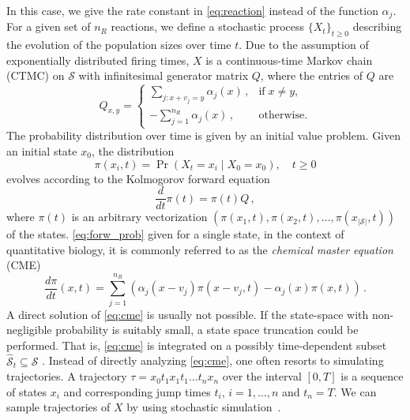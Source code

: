 In this case, we give the rate constant in \eqref{eq:reaction} instead of the function $\alpha_j$.
For a given set of $n_R$ reactions, we define a stochastic
process $\{{{X}}_t\}_{t\geq 0}$ describing the evolution of the population
sizes over time $t$.
Due to the assumption of exponentially distributed firing times,  $ X$ is
a continuous-time
Markov chain (CTMC) on $\mathcal{S}$ with infinitesimal  generator matrix $Q$, where
the entries of $Q$ are
\begin{equation}\label{eq:cme_generator}
    Q_{ x,  y} = \begin{cases}
        \sum_{j: x+ v_j = y}\alpha_j( x)\,,&\text{if}\; x\neq
         y,\\[1ex]
        -\sum_{j=1}^{n_R} \alpha_j( x)\,, &\text{otherwise.}
    \end{cases}
\end{equation}
The probability distribution over time is given by an
initial value problem.
Given an initial state $x_0$, the distribution
\begin{equation}\label{eq:forw_prob}
\pi(x_i, t)=\Pr(X_t=x_i\mid X_0=x_0),\quad t\geq 0
\end{equation}
evolves according to the Kolmogorov forward equation
\begin{equation}\label{eq:forward}
\frac{d}{dt}\pi(t) = \pi(t) Q\,,
\end{equation}
where $\pi(t)$ is an arbitrary vectorization $(\pi(x_1,t), \pi(x_2,t),\dots,\pi(x_{|\mathcal{S}|},t))$ of the states.
\eqref{eq:forw_prob} given for a single state, in the context of quantitative biology, it is commonly referred to
as the \emph{chemical master equation} (CME)
\begin{equation}\label{eq:cme}
    \frac{d\pi}{d t} ( x,t) =
    \sum_{j=1}^{n_R}\left(
        \alpha_j( x- v_j)\pi( x- v_j,t) - \alpha_j( x)\pi( x,t)
    \right)\,.
\end{equation}
A direct solution of \eqref{eq:cme} is usually not possible.
If the state-space with non-negligible probability is suitably small, a state space
truncation could be performed. That is, \eqref{eq:cme} is integrated on a possibly time-dependent subset
$\hat{\mathcal{S}}_t\subseteq\mathcal{S}$ \cite{henzinger2009sliding,munsky2006finite,spieler2014numerical}.
Instead of directly analyzing \eqref{eq:cme}, one often resorts to simulating trajectories.
A trajectory $\tau=x_0t_1x_1t_1\dots t_n x_n$ over the interval $[0,T]$ is a sequence of states $x_i$
and corresponding
jump times $t_i$, $i=1,\dots,n$ and $t_n=T$.
We can sample trajectories of $X$ by using stochastic simulation~\cite{gillespie1977exact}.

